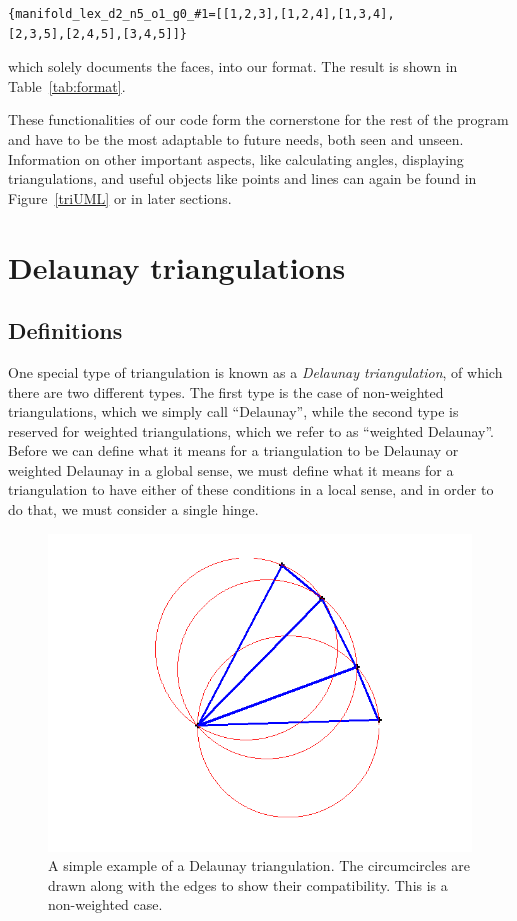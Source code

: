 \documentclass[12pt]{article}
\begin{document}
\begin{verbatim}{manifold_lex_d2_n5_o1_g0_#1=[[1,2,3],[1,2,4],[1,3,4],
[2,3,5],[2,4,5],[3,4,5]]}
\end{verbatim}
 
\noindent which solely documents the faces, into our format. The result is shown in Table~\ref{tab:format}.\newline

\noindent These functionalities of our code form the cornerstone for the rest of the program and have to be the most adaptable to future needs, both seen and unseen. Information on other important aspects, like calculating angles, displaying triangulations, and useful objects like points and lines can again be found in Figure~\ref{triUML} or in later sections. 

\section{Delaunay triangulations}
\label{DT}

\subsection{Definitions}
\label{DTD}

\noindent One special type of triangulation is known as a \textit{Delaunay triangulation}, of which there are two different types. The first type is the case of non-weighted triangulations, which we simply call ``Delaunay'', while the second type is reserved for weighted triangulations, which we refer to as ``weighted Delaunay''. Before we can define what it means for a triangulation to be Delaunay or weighted Delaunay in a global sense, we must define what it means for a triangulation to have either of these conditions in a local sense, and in order to do that, we must consider a single hinge.\newline

\begin{figure}
\centering
\includegraphics[scale = 0.6]{Pictures/genTri4.png}
\caption{A simple example of a Delaunay triangulation. The circumcircles are drawn along with the edges to show their compatibility. This is a non-weighted case.}
\label{genTri}
\end{figure}
\end{document}
